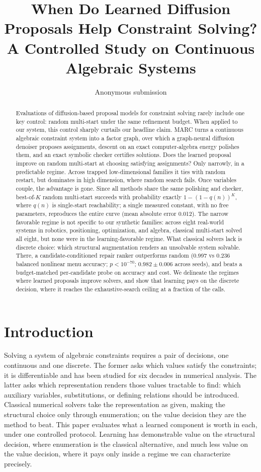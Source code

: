 \documentclass[letterpaper]{article} %
\title{When Do Learned Diffusion Proposals Help Constraint Solving?\\
A Controlled Study on Continuous Algebraic Systems}
\author{Anonymous submission}
\date{}
\begin{document}
\maketitle

\begin{abstract}
Evaluations of diffusion-based proposal models for constraint solving rarely include one key
control: random multi-start under the same refinement budget. When applied to our system,
this control sharply curtails our headline claim. MARC turns a continuous algebraic
constraint system into a factor graph, over which a graph-neural diffusion denoiser proposes
assignments, descent on an exact computer-algebra energy polishes them, and an exact symbolic
checker certifies solutions. Does the learned proposal improve on random multi-start at
choosing satisfying assignments? Only narrowly, in a predictable regime. Across trapped
low-dimensional families it ties with random restart, but dominates in high dimension, where
random search fails. Once variables couple, the advantage is gone. Since all methods share
the same polishing and checker, best-of-$K$ random multi-start succeeds with probability
exactly $1-(1-q(n))^K$, where $q(n)$ is single-start reachability; a single measured constant,
with no free parameters, reproduces the entire curve (mean absolute error 0.012). The narrow
favorable regime is not specific to our synthetic families: across eight real-world systems
in robotics, positioning, optimization, and algebra, classical multi-start solved all eight,
but none were in the learning-favorable regime. What classical solvers lack is discrete
choice: which structural augmentation renders an unsolvable system solvable. There, a
candidate-conditioned repair ranker outperforms random (0.997 vs 0.236 balanced nonlinear
menu accuracy; $p<10^{-70}$; $0.982\pm0.006$ across seeds), and beats a budget-matched
per-candidate probe on accuracy and cost. We delineate the regimes where learned proposals
improve solvers, and show that learning pays on the discrete decision, where it reaches the
exhaustive-search ceiling at a fraction of the calls.
\end{abstract}

\section{Introduction}
\label{sec:intro}

Solving a system of algebraic constraints requires a pair of decisions, one continuous and
one discrete. The former asks which values satisfy the constraints; it is differentiable and
has been studied for six decades in numerical analysis. The latter asks which representation
renders those values tractable to find: which auxiliary variables, substitutions, or defining
relations should be introduced. Classical numerical solvers take the representation as given,
making the structural choice only through enumeration; on the value decision they are the
method to beat. This paper evaluates what a learned component is worth in each, under one
controlled protocol. Learning has demonstrable value on the structural decision, where
enumeration is the classical alternative, and much less value on the value decision, where it
pays only inside a regime we can characterize precisely.
\end{document}

